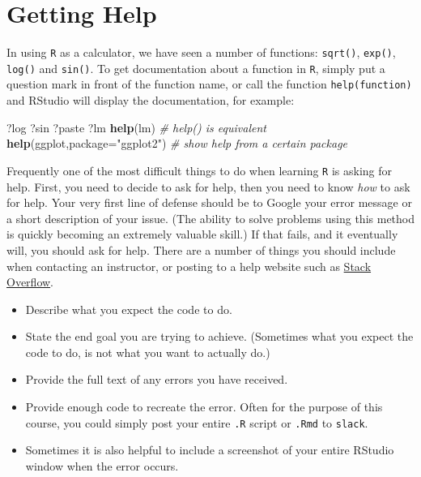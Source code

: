 \documentclass[]{book}
\newenvironment{Shaded}{\begin{snugshade}}{\end{snugshade}}
\newcommand{\KeywordTok}[1]{\textcolor[rgb]{0.13,0.29,0.53}{\textbf{#1}}}
\newcommand{\DataTypeTok}[1]{\textcolor[rgb]{0.13,0.29,0.53}{#1}}
\newcommand{\StringTok}[1]{\textcolor[rgb]{0.31,0.60,0.02}{#1}}
\newcommand{\CommentTok}[1]{\textcolor[rgb]{0.56,0.35,0.01}{\textit{#1}}}
\newcommand{\NormalTok}[1]{#1}
\providecommand{\tightlist}{%
  \setlength{\itemsep}{0pt}\setlength{\parskip}{0pt}}
\begin{document}
\section{Getting Help}\label{getting-help}

In using \texttt{R} as a calculator, we have seen a number of functions:
\texttt{sqrt()}, \texttt{exp()}, \texttt{log()} and \texttt{sin()}. To
get documentation about a function in \texttt{R}, simply put a question
mark in front of the function name, or call the function
\texttt{help(function)} and RStudio will display the documentation, for
example:

\begin{Shaded}
\begin{Highlighting}[]
\NormalTok{?log}
\NormalTok{?sin}
\NormalTok{?paste}
\NormalTok{?lm}
\KeywordTok{help}\NormalTok{(lm)   }\CommentTok{# help() is equivalent}
\KeywordTok{help}\NormalTok{(ggplot,}\DataTypeTok{package=}\StringTok{"ggplot2"}\NormalTok{)  }\CommentTok{# show help from a certain package}
\end{Highlighting}
\end{Shaded}

Frequently one of the most difficult things to do when learning
\texttt{R} is asking for help. First, you need to decide to ask for
help, then you need to know \emph{how} to ask for help. Your very first
line of defense should be to Google your error message or a short
description of your issue. (The ability to solve problems using this
method is quickly becoming an extremely valuable skill.) If that fails,
and it eventually will, you should ask for help. There are a number of
things you should include when contacting an instructor, or posting to a
help website such as \href{https://stackoverflow.com}{Stack Overflow}.

\begin{itemize}
\tightlist
\item
  Describe what you expect the code to do.
\item
  State the end goal you are trying to achieve. (Sometimes what you
  expect the code to do, is not what you want to actually do.)
\item
  Provide the full text of any errors you have received.
\item
  Provide enough code to recreate the error. Often for the purpose of
  this course, you could simply post your entire \texttt{.R} script or
  \texttt{.Rmd} to \texttt{slack}.
\item
  Sometimes it is also helpful to include a screenshot of your entire
  RStudio window when the error occurs.
\end{itemize}
\end{document}
